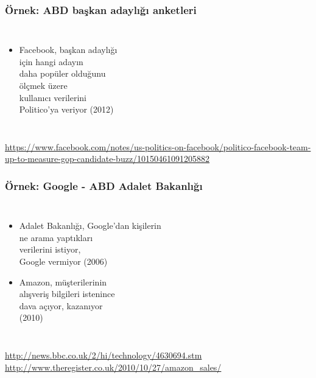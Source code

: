 \documentclass[dvipsnames]{beamer}
\theoremstyle{plain}
\begin{document}
\begin{frame}
  \frametitle{Örnek: ABD başkan adaylığı anketleri}

  \begin{columns}

    \begin{itemize}
      \item Facebook, başkan adaylığı\\
        için hangi adayın\\
        daha popüler olduğunu\\
        ölçmek üzere\\
        kullanıcı verilerini\\
        Politico'ya veriyor (2012)
    \end{itemize}
  \end{columns}

  \medskip
  \tiny{\url{https://www.facebook.com/notes/us-politics-on-facebook/politico-facebook-team-up-to-measure-gop-candidate-buzz/10150461091205882}}\\
\end{frame}

\begin{frame}
  \frametitle{Örnek: Google - ABD Adalet Bakanlığı}

  \begin{columns}

    \begin{itemize}
      \item Adalet Bakanlığı, Google'dan kişilerin\\
        ne arama yaptıkları\\
        verilerini istiyor,\\
        Google vermiyor (2006)

      \pause
      \medskip
      \item Amazon, müşterilerinin\\
        alışveriş bilgileri istenince\\
        dava açıyor, kazanıyor\\
        (2010)
    \end{itemize}
  \end{columns}

  \medskip
  \tiny{\url{http://news.bbc.co.uk/2/hi/technology/4630694.stm}}\\
  \tiny{\url{http://www.theregister.co.uk/2010/10/27/amazon_sales/}}\\
\end{frame}
\end{document}
